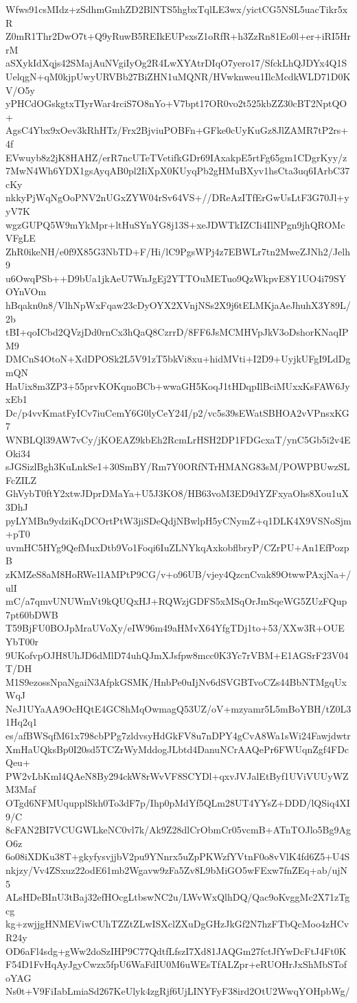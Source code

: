 Wfws91csMIdz+zSdhmGmhZD2BlNTS5hgbxTqlLE3wx/yictCG5NSL5uacTikr5xR
Z0mR1Thr2DwO7t+Q9yRuwB5REIkEUPsxsZ1oRfR+h3ZzRn81Eo0l+er+iRI5HrrM
aSXykIdXqjs42SMajAuNVgiIyOg2R4LwXYAtrDIqO7yero17/SfckLhQJDYx4Q1S
UelqgN+qM0kjpUwyURVBb27BiZHN1uMQNR/HVwknweu1IlcMcdkWLD71D0KV/O5y
yPHCdOGskgtxTIyrWar4rciS7O8nYo+V7bpt17OR0vo2t525kbZZ30cBT2NptQO+
AgsC4Ybx9xOev3kRhHTz/Frx2BjviuPOBFn+GFke0cUyKuGz8JlZAMR7tP2rs+4f
EVwuyb8z2jK8HAHZ/erR7ncUTeTVetifkGDr69IAxakpE5rtFg65gm1CDgrKyy/z
7MwN4Wh6YDX1gsAyqAB0pl2IiXpX0KUyqPb2gHMuBXyv1hsCta3uq6IArbC37cKy
nkkyPjWqNgOoPNV2nUGxZYW04rSv64VS+//DReAzITfErGwUsLtF3G70Jl+yyV7K
wgzGUPQ5W9mYkMpr+ltHuSYnYG8j13S+xeJDWTkIZCIi4IlNPgn9jhQROMcVFgLE
ZhR0ikeNH/e0f9X85G3NbTD+F/Hi/lC9PgsWPj4z7EBWLr7tn2MweZJNh2/Jelh9
u6OwqPSb++D9bUa1jkAeU7WnJgEj2YTTOuMETuo9QzWkpvE8Y1UO4i79SYOYnVOm
hBqakn0n8/VlhNpWxFqaw23cDyOYX2XVnjNSs2X9j6tELMKjaAeJhuhX3Y89L/2b
tBI+qoICbd2QVzjDd0rnCx3hQaQ8CzrrD/8FF6JsMCMHVpJkV3oDshorKNaqIPM9
DMCnS4OtoN+XdDPOSk2L5V91zT5bkVi8xu+hidMVti+I2D9+UyjkUFgI9LdDgmQN
HaUix8m3ZP3+55prvKOKqnoBCb+wwaGH5KoqJ1tHDqpIlBciMUxxKsFAW6JyxEb1
Dc/p4vvKmatFyICv7iuCemY6G0lyCeY24I/p2/vc5s39sEWatSBHOA2vVPnsxKG7
WNBLQl39AW7vCy/jKOEAZ9kbEh2RcmLrHSH2DP1FDGcxaT/ynC5Gb5i2v4EOki34
sJGSizlBgh3KuLnkSe1+30SmBY/Rm7Y0ORfNTrHMANG83sM/POWPBUwzSLFcZILZ
GhVybT0ftY2xtwJDprDMaYa+U5J3KO8/HB63voM3ED9dYZFxyaOhs8Xou1uX3DhJ
pyLYMBn9ydziKqDCOrtPtW3jiSDeQdjNBwlpH5yCNymZ+q1DLK4X9VSNoSjm+pT0
uvmHC5HYg9QefMuxDtb9Vo1Foqi6IuZLNYkqAxkobflbryP/CZrPU+An1EfPozpB
zKMZeS8aM8HoRWe1lAMPtP9CG/v+o96UB/vjey4QzcnCvak89OtwwPAxjNa+/ulI
mC/a7qmvUNUWmVt9kQUQxHJ+RQWzjGDFS5xMSqOrJmSqeWG5ZUzFQup7pt60bDWB
T59BjFU0BOJpMraUVoXy/eIW96m49aHMvX64YfgTDj1to+53/XXw3R+OUEYbT00r
9UKofvpOJH8UhJD6dMlD74uhQJmXJsfpw8mcc0K3Yc7rVBM+E1AGSrF23V04T/DH
M1S9ezossNpaNgaiN3AfpkGSMK/HnbPe0uIjNv6dSVGBTvoCZs44BbNTMgqUxWqJ
NeJ1UYaAA9OcHQtE4GC8hMqOwmagQ53UZ/oV+mzyamr5L5mBoYBH/tZ0L31Hq2q1
es/afBWSqfM61x798cbPPg7zldvsyHdGkFV8u7nDPY4gCvA8Wa1sWi24Fawjdwtr
XmHaUQksBp0I20sd5TCZrWyMddogJLbtd4DanuNCrAAQePr6FWUqnZgf4FDcQeu+
PW2vLbKml4QAeN8By294ckW8rWvVF8SCYDl+qxvJVJalEtByf1UViVUUyWZM3Maf
OTgd6NFMUqupplSkh0To3dF7p/Ihp0pMdYf5QLm28UT4YYsZ+DDD/lQSiq4XI9/C
8cFAN2BI7VCUGWLkeNC0vl7k/Ak9Z28dlCrObmCr05vcmB+ATnTOJlo5Bg9AgO6z
6o08iXDKu38T+gkyfysvjjbV2pu9YNnrx5uZpPKWzfYVtnF0o8vVlK4fd6Z5+U4S
nkjzy/Vv4ZSxuz22odE61mb2Wgavw9zFa5Zv8L9bMiGO5wFExw7fnZEq+ab/ujN5
ALsHDeBInU3tBaj32efHOcgLtbswNC2u/LWvWxQlhDQ/Qac9oKvggMc2X71zTgcg
kg+zwjjgHNMEViwCUhTZZtZLwISXclZXuDgGHzJkGf2N7hzFTbQcMoo4zHCvR24y
OD6aFl4sdg+gWw2doSzIHP9C77QdtfLfszI7Xd81JAQGm27fctJfYwDcFtJ4Ft0K
F54D1FvHqAyJgyCwzx5fpU6WaFdIU0M6uWEsTfALZpr+eRUOHrJxShMbSTofoYAG
Ns0t+V9FiIabLmiaSd267KeUlyk4zgRjf6UjLINYFyF38ird2OtU2WwqYOHpbWg/
